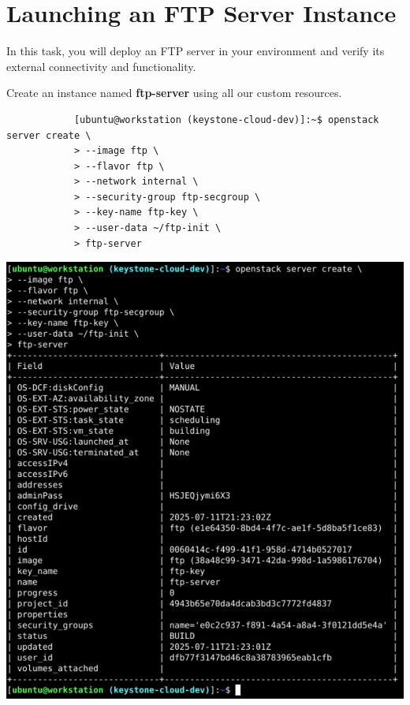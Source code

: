 \documentclass[letterpaper, 12pt]{article}
\begin{document}
\section{Launching an FTP Server Instance}\label{sec:launching-an-ftp-server--instance}
In this task, you will deploy an FTP server in your environment and verify its external connectivity and functionality.

\begin{enumerate}
    \begin{labstep}
        Create an instance named \textbf{ftp-server} using all our custom resources.
        \begin{lstlisting}
            [ubuntu@workstation (keystone-cloud-dev)]:~$ openstack server create \
            > --image ftp \
            > --flavor ftp \
            > --network internal \
            > --security-group ftp-secgroup \
            > --key-name ftp-key \
            > --user-data ~/ftp-init \
            > ftp-server
        \end{lstlisting}

        \begin{center}
            \includegraphics[scale=0.55]{images/part2/step1.png}
        \end{center}
    \end{labstep}


\end{enumerate}
\end{document}

